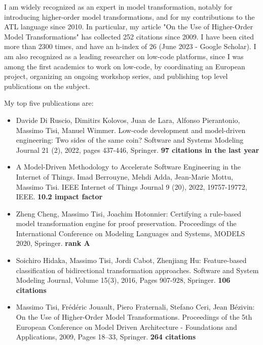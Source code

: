 I am widely recognized as an expert in model transformation, notably for introducing higher-order model transformations, and for my contributions to the ATL language since 2010. In particular, my article "On the Use of Higher-Order Model Transformations" has collected 252 citations since 2009. I have been cited more than 2300 times, and have an h-index of 26 (June 2023 - Google Scholar). I am also recognized as a leading researcher on low-code platforms, since I was among the first academics to work on low-code, by coordinating an European project, organizing an ongoing workshop series, and publishing top level publications on the subject. 

\medskip
My top five publications are:
\begin{itemize}
\item Davide Di Ruscio, Dimitirs Kolovos, Juan de Lara, Alfonso Pierantonio, Massimo Tisi, Manuel Wimmer. Low-code development and model-driven engineering: Two sides of the same coin? Software and Systems Modeling Journal 21 (2), 2022, pages 437-446, Springer. \textbf{97 citations in the last year}
\item A Model-Driven Methodology to Accelerate Software Engineering in the Internet of Things. Imad Berrouyne, Mehdi Adda, Jean-Marie Mottu, Massimo Tisi. IEEE Internet of Things Journal 9 (20), 2022, 19757-19772, IEEE. \textbf{10.2 impact factor}
\item Zheng Cheng, Massimo Tisi, Joachim Hotonnier: Certifying a rule-based model transformation engine for proof preservation. Proceedings of the International Conference on Modeling Languages and Systems, MODELS 2020, Springer. \textbf{rank A}
\item Soichiro Hidaka, Massimo Tisi, Jordi Cabot, Zhenjiang Hu: Feature-based classification of bidirectional transformation approaches. Software and System Modeling Journal, Volume 15(3), 2016, Pages 907-928, Springer. \textbf{106 citations} 
\item Massimo Tisi, Frédéric Jouault, Piero Fraternali, Stefano Ceri, Jean Bézivin: On the Use of Higher-Order Model Transformations. Proceedings of the 5th European Conference on Model Driven Architecture - Foundations and Applications, 2009, Pages 18–33, Springer. \textbf{264 citations}
\end{itemize}

